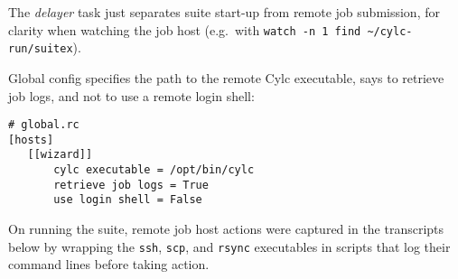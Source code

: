 The {\em delayer} task just separates suite start-up from remote job
submission, for clarity when watching the job host (e.g.\ with
\lstinline=watch -n 1 find ~/cylc-run/suitex=).

Global config specifies the path to the remote Cylc executable, says
to retrieve job logs, and not to use a remote login shell:
\begin{lstlisting}
# global.rc
[hosts]
   [[wizard]]
       cylc executable = /opt/bin/cylc
       retrieve job logs = True
       use login shell = False
\end{lstlisting}

On running the suite, remote job host actions were captured in the transcripts
below by wrapping the \lstinline=ssh=, \lstinline=scp=, and \lstinline=rsync=
executables in scripts that log their command lines before taking action.
